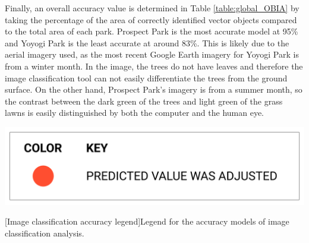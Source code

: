 \begin{multicols}{2}
Finally, an overall accuracy value is determined in Table \ref{table:global_OBIA} by taking the percentage of the area of correctly identified vector objects compared to the total area of each park. Prospect Park is the most accurate model at 95\% and Yoyogi Park is the least accurate at around 83\%. This is likely due to the aerial imagery used, as the most recent Google Earth imagery for Yoyogi Park is from a winter month. In the image, the trees do not have leaves and therefore the image classification tool can not easily differentiate the trees from the ground surface. On the other hand, Prospect Park's imagery is from a summer month, so the contrast between the dark green of the trees and light green of the grass lawns is easily distinguished by both the computer and the human eye.

\begin{minipage}{0.45\textwidth}
    \centering
    \includegraphics[width=\linewidth]{images/gatherings/accuracy_legend.png}\par{}[Image classification accuracy legend]{Legend for the accuracy models of image classification analysis.}
    \label{fig:accuracy_legend}
\end{minipage}


\end{multicols}
